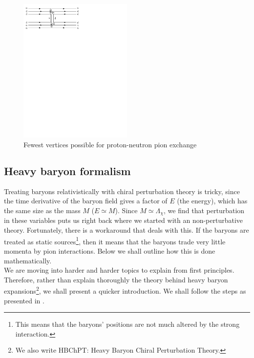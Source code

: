 \documentclass[10pt,twoside]{report}
\begin{document}
	
	
	\begin{figure}[h]
		\centering
		\includegraphics[trim={0.5cm 22cm 10cm 0cm},width=0.5\textwidth]{Figures/Pion_exch.pdf}
		\caption{Fewest vertices possible for proton-neutron pion exchange}
		\label{fey:1}
	\end{figure}
	
	\subsection{Heavy baryon formalism}
	Treating baryons relativistically with chiral perturbation theory is tricky, since the time derivative of the baryon field gives a factor of $E$ (the energy), which has the same size as the mass $M$ ($E\simeq M$). Since $M\simeq\Lambda_\chi$, we find that perturbation in these variables puts us right back where we started with an non-perturbative theory. Fortunately, there is a workaround that deals with this. If the baryons are treated as static sources\footnote{This means that the baryons' positions are not much altered by the strong interaction.}, then it means that the baryons trade very little momenta by pion interactions. Below we shall outline how this is done mathematically.\\
	
	We are moving into harder and harder topics to explain from first principles. Therefore, rather than explain thoroughly the theory behind heavy baryon expansions\footnote{We also write HBChPT: Heavy Baryon Chiral Perturbation Theory.}, we shall present a quicker introduction. We shall follow the steps as presented in \cite{MachleidtEntem11}.\\
	
\end{document}
